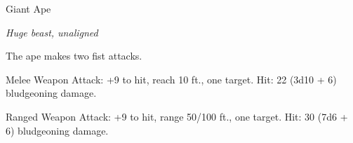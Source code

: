 \begin{monsterbox}{Giant Ape}
\begin{hangingpar}
\textit{Huge beast, unaligned}
\end{hangingpar}
\dndline%
\basics[%
armorclass = 12,
hitpoints = 15d12 + 60,
speed = {40 ft., climb 40 ft.}
]
\dndline%
\stats[%
STR = \stat{23},
DEX = \stat{14},
CON = \stat{18},
INT = \stat{7},
WIS = \stat{12},
CHA = \stat{7}
]
\dndline%
\details[%
skills={Athletics +9, Perception +4, },
damageimmunities={},
savingthrows={},
conditionimmunities={},
damageresistances={},
damagevulnerabilities={},
senses={passive Perception 14},
challenge=7
]
\dndline%
\begin{monsteraction}[Multiattack]
The ape makes two fist attacks.
\end{monsteraction}
\begin{monsteraction}[Fist]
Melee Weapon Attack: +9 to hit, reach 10 ft., one target. Hit: 22 (3d10 + 6) bludgeoning damage.
\end{monsteraction}
\begin{monsteraction}[Rock]
Ranged Weapon Attack: +9 to hit, range 50/100 ft., one target. Hit: 30 (7d6 + 6) bludgeoning damage.
\end{monsteraction}
\end{monsterbox}